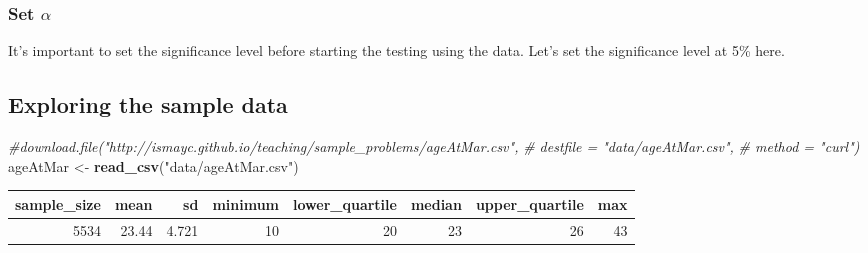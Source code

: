 \documentclass[]{tufte-book}
\newenvironment{Shaded}{\begin{snugshade}}{\end{snugshade}}
\newcommand{\KeywordTok}[1]{\textcolor[rgb]{0.13,0.29,0.53}{\textbf{{#1}}}}
\newcommand{\DataTypeTok}[1]{\textcolor[rgb]{0.13,0.29,0.53}{{#1}}}
\newcommand{\FloatTok}[1]{\textcolor[rgb]{0.00,0.00,0.81}{{#1}}}
\newcommand{\StringTok}[1]{\textcolor[rgb]{0.31,0.60,0.02}{{#1}}}
\newcommand{\CommentTok}[1]{\textcolor[rgb]{0.56,0.35,0.01}{\textit{{#1}}}}
\newcommand{\NormalTok}[1]{{#1}}
\begin{document}
\subsubsection{\texorpdfstring{Set
\(\alpha\)}{Set \textbackslash{}alpha}}\label{set-alpha}

It's important to set the significance level before starting the testing
using the data. Let's set the significance level at 5\% here.

\subsection{Exploring the sample data}\label{exploring-the-sample-data}

\begin{Shaded}
\begin{Highlighting}[]
\CommentTok{#download.file("http://ismayc.github.io/teaching/sample_problems/ageAtMar.csv", }
\CommentTok{#  destfile = "data/ageAtMar.csv",}
\CommentTok{#  method = "curl")}
\NormalTok{ageAtMar <-}\StringTok{ }\KeywordTok{read_csv}\NormalTok{(}\StringTok{"data/ageAtMar.csv"}\NormalTok{)}
\end{Highlighting}
\end{Shaded}

\begin{Shaded}
\end{Shaded}

\begin{tabular}{r|r|r|r|r|r|r|r}
\hline
sample\_size & mean & sd & minimum & lower\_quartile & median & upper\_quartile & max\\
\hline
5534 & 23.44 & 4.721 & 10 & 20 & 23 & 26 & 43\\
\hline
\end{tabular}
\end{document}
